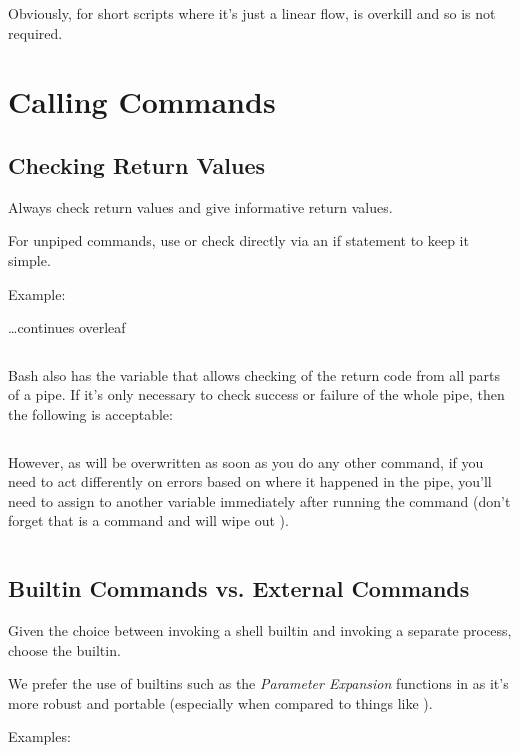 \documentclass{article}
\begin{document}
\inputminted[frame=single,firstline=473, lastline=473, linenos]{bash}{./styleguide.bash}

Obviously, for short scripts where it’s just a linear flow,  is overkill and so is not required.

\section{Calling Commands}
\label{sec:call_cmds}
\subsection{Checking Return Values}
\label{subsec:check_rt_vals}
Always check return values and give informative return values.

For unpiped commands, use  or check directly via an if statement to keep it simple.

Example:

\begin{center}
\vspace{2em}
\ldots continues overleaf    
\end{center}
\newpage
\inputminted[frame=single,firstline=475, lastline=485, linenos]{bash}{./styleguide.bash}

Bash also has the  variable that allows checking of the return code from all parts of a pipe. If it’s only necessary to check success or failure of the whole pipe, then the following is acceptable:

\inputminted[frame=single,firstline=487, lastline=490, linenos]{bash}{./styleguide.bash}

However, as  will be overwritten as soon as you do any other command, if you need to act differently on errors based on where it happened in the pipe, you’ll need to assign  to another variable immediately after running the command (don’t forget that \code{[} is a command and will wipe out ).

\inputminted[frame=single,firstline=492, lastline=499, linenos]{bash}{./styleguide.bash}

\subsection{Builtin Commands vs. External Commands}
\label{subsec:Built_cmds}
Given the choice between invoking a shell builtin and invoking a separate process, choose the builtin.

We prefer the use of builtins such as the \emph{Parameter Expansion} functions in  as it’s more robust and portable (especially when compared to things like ).

Examples:

\inputminted[frame=single,firstline=501, lastline=503, linenos]{bash}{./styleguide.bash}

\inputminted[frame=single,firstline=505, lastline=507, linenos]{bash}{./styleguide.bash}
\end{document}

